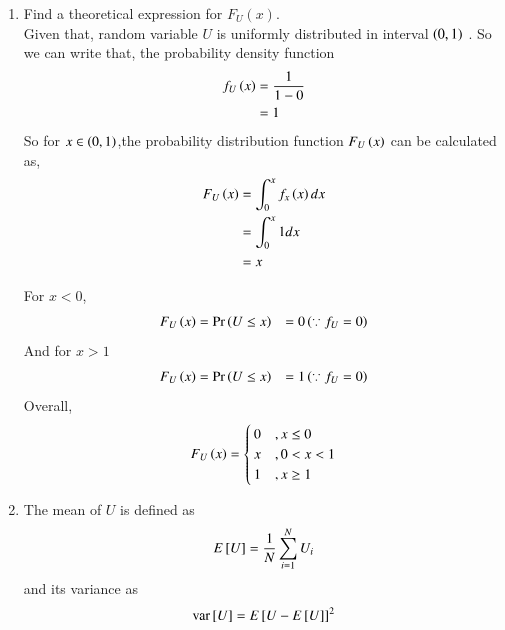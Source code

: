 \documentclass[journal,12pt,twocolumn]{IEEEtran}
\renewcommand\thesection{\arabic{section}}
\begin{document}
\begin{enumerate}[label=\thesection.\arabic*,ref=\thesection.\theenumi]
%
\item
Find a theoretical expression for $F_{U}(x)$.\\
\solution Given that, random variable $U$ is uniformly distributed in interval $\left(0,1\right)$ . So we can write that, the probability density function
               \begin{align}
                        f_{U}\left(x\right) &= \frac{1}{1 -0}\\
                                      &= 1
               \end{align}
       So for $ x \in \left(0,1\right) $,the probability distribution function $F_{U}\left(x\right)$ can be calculated as,
               \begin{align}
                           F_{U}\left(x\right) &= \int_{0}^{x} f_x\left(x\right)dx\\
                                         &= \int_{0}^{x}1dx\\
                                         &= x
                \end{align}

       For $x<0$,
		\begin{align}
			F_{U}\left(x\right) &= \Pr\left(U \leq x\right)
		                      &= 0 \left(\because f_{U} = 0\right)
                \end{align}
	And for $x>1$
		\begin{align}
			F_{U}\left(x\right) &= \Pr\left(U \leq x\right)
                    &= 1 \left(\because f_{U} = 0\right)
    \end{align}
        Overall,		
		\begin{equation*}
                                 F_{U}\left(x\right) = \begin{cases}
                                                          0  &, x \leq 0 \\
                                                          x  &, 0<x<1 \\
                                                          1  & , x \geq 1
                                                        \end{cases}
                 \end{equation*}

\item
The mean of $U$ is defined as
%
\begin{equation}
E{}\left[U\right] = \frac{1}{N}\sum_{i=1}^{N}U_i
\end{equation}
%
and its variance as
%
\begin{equation}
\text{var}{}\left[U\right] = E{}\left[U- E{}\left[U\right]\right]^2 
\end{equation}


\end{enumerate}
\end{document}
